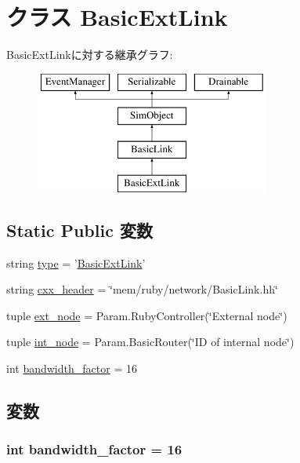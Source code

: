 \hypertarget{classBasicLink_1_1BasicExtLink}{
\section{クラス BasicExtLink}
\label{classBasicLink_1_1BasicExtLink}
}
BasicExtLinkに対する継承グラフ:\begin{figure}[H]
\begin{center}
\leavevmode
\includegraphics[height=4cm]{classBasicLink_1_1BasicExtLink}
\end{center}
\end{figure}
\subsection*{Static Public 変数}
\begin{DoxyCompactItemize}
\item 
string \hyperlink{classBasicLink_1_1BasicExtLink_acce15679d830831b0bbe8ebc2a60b2ca}{type} = '\hyperlink{classBasicLink_1_1BasicExtLink}{BasicExtLink}'
\item 
string \hyperlink{classBasicLink_1_1BasicExtLink_a17da7064bc5c518791f0c891eff05fda}{cxx\_\-header} = \char`\"{}mem/ruby/network/BasicLink.hh\char`\"{}
\item 
tuple \hyperlink{classBasicLink_1_1BasicExtLink_a84162bb9f01ed7cd5b41e306b611b5b0}{ext\_\-node} = Param.RubyController(\char`\"{}External node\char`\"{})
\item 
tuple \hyperlink{classBasicLink_1_1BasicExtLink_a9eeb322a8d27b584b2a08400f8d1b9d1}{int\_\-node} = Param.BasicRouter(\char`\"{}ID of internal node\char`\"{})
\item 
int \hyperlink{classBasicLink_1_1BasicExtLink_affbbb1b5f39453ff2abf6f5ae9385606}{bandwidth\_\-factor} = 16
\end{DoxyCompactItemize}


\subsection{変数}
\hypertarget{classBasicLink_1_1BasicExtLink_affbbb1b5f39453ff2abf6f5ae9385606}{
\subsubsection[{bandwidth\_\-factor}]{\setlength{\rightskip}{0pt plus 5cm}int {\bf bandwidth\_\-factor} = 16}}
\label{classBasicLink_1_1BasicExtLink_affbbb1b5f39453ff2abf6f5ae9385606}


